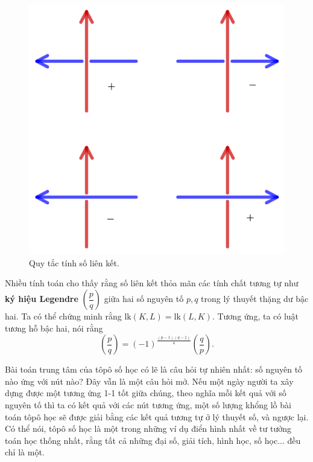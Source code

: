 \documentclass[12pt]{article}
\begin{document}
\begin{figure}[h!]
    \centering
    \includegraphics[scale = .2]{h16}
    \caption{Quy tắc tính số liên kết.}
    \label{h16}
\end{figure}

Nhiều tính toán cho thấy rằng số liên kết thỏa mãn các tính chất tương tự như {\bf ký hiệu Legendre} $\left(\dfrac{p}{q}\right)$ giữa hai số nguyên tố $p, q$ trong lý thuyết thặng dư bậc hai. Ta có thể chứng minh rằng $\text{lk}(K,L) = \text{lk}(L,K)$. Tương ứng, ta có luật tương hỗ bậc hai, nói rằng 
    $$\left(\dfrac{p}{q}\right) = (-1)^{\tfrac{(p-1)(q-1)}{4}}\left(\dfrac{q}{p}\right).$$

Bài toán trung tâm của tôpô số học có lẽ là câu hỏi tự nhiên nhất: số nguyên tố nào ứng với nút nào? Đây vẫn là một câu hỏi mở. Nếu một ngày người ta xây dựng được một tương ứng 1-1 tốt giữa chúng, theo nghĩa mỗi kết quả với số nguyên tố thì ta có kết quả với các nút tương ứng, một số lượng khổng lồ bài toán tôpô học sẽ được giải bằng các kết quả tương tự ở lý thuyết số, và ngược lại. Có thể nói, tôpô số học là một trong những ví dụ điển hình nhất về tư tưởng toán học thống nhất, rằng tất cả những đại số, giải tích, hình học, số học... đều chỉ là một.
\end{document}
